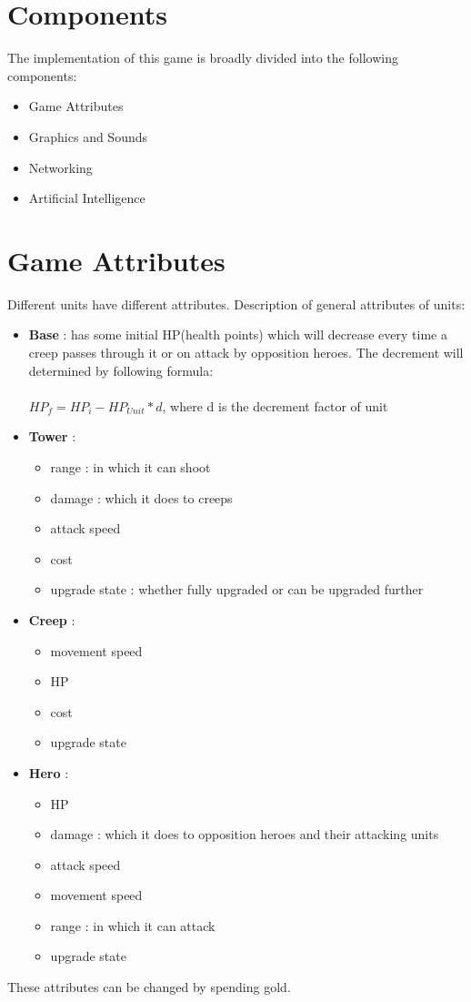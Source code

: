 \documentclass{article}
\begin{document}
\newpage
\section{Components}
The implementation of this game is broadly divided into the following components:
\begin{itemize}
\item Game Attributes
\item Graphics and Sounds
\item Networking
\item Artificial Intelligence
\end{itemize}

\section{Game Attributes}
Different units have different attributes. Description of general attributes of units:
\begin{itemize}
\item \textbf{Base} : has some initial HP(health points) which will decrease every time a creep passes through it or on attack by opposition heroes. The decrement will determined by following formula:\\\\
 $ HP_{f} = HP_{i} - HP_{Unit}*d$, where d is the decrement factor of unit 
\item \textbf{Tower} :
\begin{itemize}
\item range : in which it can shoot
\item damage : which it does to creeps
\item attack speed
\item cost
\item upgrade state : whether fully upgraded or can be upgraded further
\end{itemize}
\item \textbf{Creep} :
\begin{itemize}
\item movement speed
\item HP
\item cost
\item upgrade state
\end{itemize}
\item \textbf{Hero} :
\begin{itemize}
\item HP
\item damage : which it does to opposition heroes and their attacking units
\item attack speed
\item movement speed
\item range : in which it can attack
\item upgrade state
\end{itemize}
\end{itemize}
These attributes can be changed by spending gold.
\end{document}
